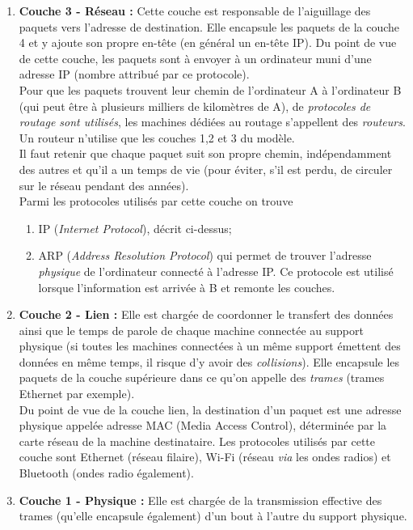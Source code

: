 \documentclass[a4paper,12pt]{book}
\begin{document}
\begin{enumerate}[]
	\item 	\textbf{Couche 3 - Réseau :} Cette  couche est responsable de l'aiguillage des paquets vers l'adresse de destination. Elle encapsule les paquets de la couche 4 et y ajoute son propre en-tête (en général un en-tête IP). Du point de vue de cette couche, les paquets sont à envoyer à un ordinateur muni d'une adresse IP (nombre attribué par ce protocole).\\ Pour que les paquets trouvent leur chemin de l'ordinateur A à l'ordinateur B (qui peut être à plusieurs milliers de kilomètres de A), de \textit{protocoles de routage sont utilisés}, les machines dédiées au routage s'appellent des \textit{routeurs}. Un routeur n'utilise que les couches 1,2 et 3 du modèle.\\
	Il faut retenir que chaque paquet suit son propre chemin, indépendamment des autres et qu'il a un \og temps de vie\fg{} (pour éviter, s'il est perdu, de circuler sur le réseau pendant des années).\\
	Parmi les protocoles utilisés par cette couche on trouve
	\begin{enumerate}[--]
		\item 	IP (\textit{Internet Protocol}), décrit ci-dessus;
		\item 	ARP (\textit{Address Resolution Protocol}) qui permet de trouver l'adresse \textit{physique} de l'ordinateur connecté à l'adresse IP. Ce protocole est utilisé lorsque l'information est arrivée à B et \og remonte les couches\fg{}.
	\end{enumerate} 
	\item 	\textbf{Couche 2 - Lien :} Elle est chargée de coordonner le transfert des données ainsi que le \og temps de parole\fg{} de chaque machine connectée au support physique (si toutes les machines connectées à un même support émettent des données en même temps, il risque d'y avoir des \textit{collisions}). Elle encapsule les paquets de la couche supérieure dans ce qu'on appelle des \textit{trames} (trames Ethernet par exemple).\\
	Du point de vue de la couche lien, la destination d'un paquet est une adresse physique appelée adresse MAC (Media Access Control), déterminée par la carte réseau de la machine destinataire.
	Les protocoles utilisés par cette couche sont Ethernet (réseau filaire), Wi-Fi (réseau \textit{via} les ondes radios) et Bluetooth (ondes radio également).
	\item 	\textbf{Couche 1 - Physique :} Elle est chargée de la transmission effective des trames (qu'elle encapsule également) d'un bout à l'autre du support physique.
\end{enumerate}	
\end{document}
